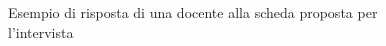 \documentclass[12pt]{report}
\begin{document}
\begin{figure}[htb]
	\centering
	\caption{Esempio di risposta di una docente alla scheda proposta per l'intervista}\label{classificazione_insegnanti}
\end{figure}
\end{document}
